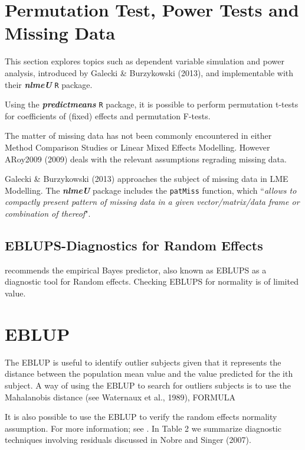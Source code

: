 \documentclass[12pt, a4paper]{report}
\theoremstyle{plain}
\theoremstyle{definition}
\theoremstyle{remark}
\begin{document}
	\section*{Permutation Test, Power Tests and Missing Data }
	
	This section explores topics such as dependent variable simulation and power analysis, introduced by Galecki \& Burzykowski (2013), and implementable with their \textbf{\textit{nlmeU}} \texttt{R} package.
	
	Using the \textbf{\textit{predictmeans}} \texttt{R} package, it is possible to perform permutation t-tests for coefficients of (fixed) effects and permutation F-tests.
	
	The matter of missing data has not been commonly encountered in either Method Comparison Studies or Linear Mixed Effects Modelling. However ARoy2009 (2009) deals with the relevant assumptions regrading missing data. 
	
	Galecki \& Burzykowski (2013) approaches the subject of missing data in LME Modelling. The \textbf{\textit{nlmeU}} package includes the \texttt{patMiss} function, which ``\textit{allows to compactly present pattern of missing data in a given vector/matrix/data
		frame or combination of thereof}".
	
	
	
\subsection{EBLUPS-Diagnostics for Random Effects}
\citet{west} recommends the empirical Bayes predictor, also known as EBLUPS as a diagnostic tool for Random effects. Checking EBLUPS for normality is of limited value.


\section{EBLUP}


The EBLUP is useful to identify outlier subjects given that it represents the distance between the population mean value and the value predicted for the ith subject. A way of using the EBLUP to search for outliers subjects is to use the Mahalanobis distance (see Waternaux et al., 1989), FORMULA

It is also possible to use the EBLUP
to verify the random effects normality assumption. For more information; see \citet{nobresinger}. In Table 2 we summarize diagnostic techniques involving residuals discussed
in Nobre and Singer (2007).
\end{document}
